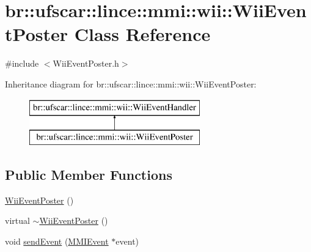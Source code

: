\hypertarget{classbr_1_1ufscar_1_1lince_1_1mmi_1_1wii_1_1WiiEventPoster}{
\section{br::ufscar::lince::mmi::wii::WiiEventPoster Class Reference}
\label{classbr_1_1ufscar_1_1lince_1_1mmi_1_1wii_1_1WiiEventPoster}
}


{\ttfamily \#include $<$WiiEventPoster.h$>$}

Inheritance diagram for br::ufscar::lince::mmi::wii::WiiEventPoster:\begin{figure}[H]
\begin{center}
\leavevmode
\includegraphics[height=2cm]{classbr_1_1ufscar_1_1lince_1_1mmi_1_1wii_1_1WiiEventPoster}
\end{center}
\end{figure}
\subsection*{Public Member Functions}
\begin{DoxyCompactItemize}
\item 
\hyperlink{classbr_1_1ufscar_1_1lince_1_1mmi_1_1wii_1_1WiiEventPoster_a36425c0fcb515ff86f97cb68b2bd70e7}{WiiEventPoster} ()
\item 
virtual \hyperlink{classbr_1_1ufscar_1_1lince_1_1mmi_1_1wii_1_1WiiEventPoster_aef8a15c7fc7e8d3b02673cd08e799fd1}{$\sim$WiiEventPoster} ()
\item 
void \hyperlink{classbr_1_1ufscar_1_1lince_1_1mmi_1_1wii_1_1WiiEventPoster_a5e1eb67b8afb4324be1899a043ee92c4}{sendEvent} (\hyperlink{classbr_1_1ufscar_1_1lince_1_1mmi_1_1MMIEvent}{MMIEvent} $\ast$event)
\end{DoxyCompactItemize}


